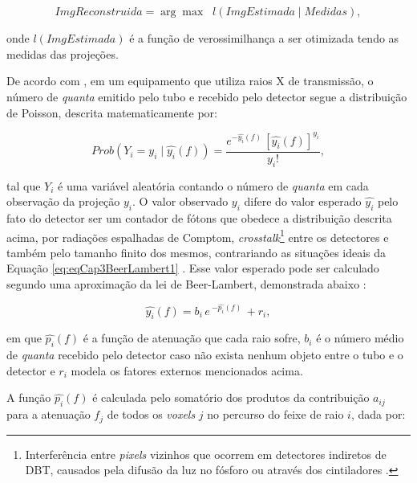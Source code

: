 {{\begin{equation}
ImgReconstruida = \underset{}{\arg\max} \;\; l(ImgEstimada \mid Medidas),
\label{eq:eqCap3ModeloVerossimilhança}
\end{equation} 

\noindent onde $l(ImgEstimada)$ é a função de verossimilhança a ser otimizada tendo as medidas das projeções.


De acordo com , em um equipamento que utiliza raios X de transmissão, o número de \textit{quanta} emitido pelo tubo e recebido pelo detector segue a distribuição de Poisson, descrita matematicamente por:

\begin{equation}
Prob(Y_{i} = y_{i} \mid \hat{y_{i}}(f) ) = \dfrac{e^{-\hat{y_{i}}(f) } \, [\hat{y_{i}}(f)] ^{y_{i}}}  {y_{i}!},
\label{eq:eqCap3DistribuicaoPoisson}
\end{equation}

\noindent tal que $Y_{i}$ é uma variável aleatória contando o número de \textit{quanta} em cada observação da projeção $y_{i}$. O valor observado $y_{i}$ difere do valor esperado $\hat{y_{i}}$ pelo fato do detector ser um contador de fótons que obedece a distribuição descrita acima, por radiações espalhadas de Comptom, \textit{crosstalk}\footnote{Interferência entre \textit{pixels} vizinhos que ocorrem em detectores indiretos de \acs{DBT}, causados pela difusão da luz no fósforo ou através dos cintiladores \cite{zheng2018detector}.} entre os detectores e também pelo tamanho finito dos mesmos, contrariando as situações ideais da Equação \ref{eq:eqCap3BeerLambert1} \cite[p. 6]{Fessler2000handbook}. Esse valor esperado pode ser calculado segundo uma aproximação da lei de Beer-Lambert, demonstrada abaixo \cite[p. 9]{Fessler2000handbook}:

\begin{equation}
\hat{y_{i}}(f) = b_{i} \, e \, ^{-\hat{p_{i}}(f)} \, + r_{i},
\label{eq:eqCap3BeerLambertDiscreto2}
\end{equation}

\noindent em que $\hat{p_{i}}(f)$ é a função de atenuação que cada raio sofre, $b_{i}$ é o número médio de \textit{quanta} recebido pelo detector caso não exista nenhum objeto entre o tubo e o detector e $r_{i}$ modela os fatores externos mencionados acima. 

A função $\hat{p_{i}}(f)$ é calculada pelo somatório dos produtos da contribuição $a_{ij}$ para a atenuação $f_{j}$ de todos os \textit{voxels} $j$ no percurso do feixe de raio $i$, dada por: 


}}
